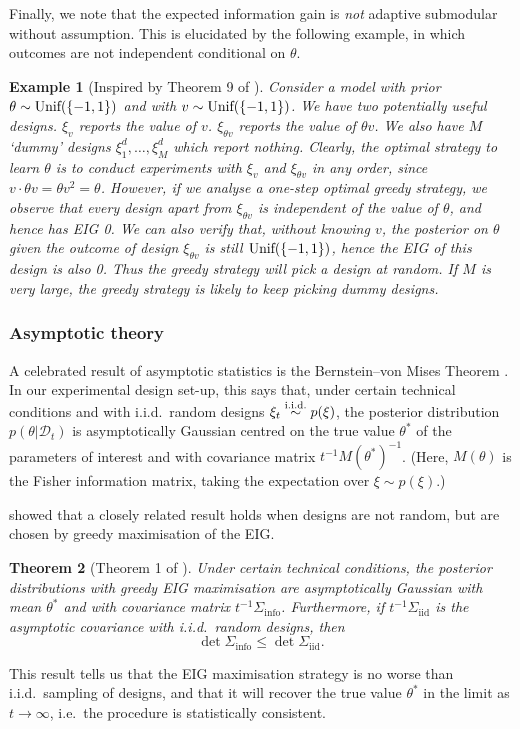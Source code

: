 \documentclass[a4paper, 10pt]{report}
\theoremstyle{plain}
\newtheorem{theorem}{Theorem}
\newtheorem{example}[theorem]{Example}
\begin{document}
	Finally, we note that the expected information gain is \emph{not} adaptive submodular without assumption. This is elucidated by the following example, in which outcomes are not independent conditional on $\theta$.
	\begin{example}[Inspired by Theorem 9 of \citet{golovin2010}]\label{example:golovin}
		Consider a model with prior $\theta \sim \textup{Unif}(\{-1, 1\})$ and with $v \sim \textup{Unif}(\{-1, 1\})$.
		We have two potentially useful designs. $\xi_v$ reports the value of $v$. $\xi_{\theta v}$ reports the value of $\theta v$.
		We also have $M$ `dummy' designs $\xi^d_1,\dots,\xi^d_M$ which report nothing.
		Clearly, the optimal strategy to learn $\theta$ is to conduct experiments with $\xi_v$ and $\xi_{\theta v}$ in any order, since $v \cdot \theta v = \theta v^2 = \theta$.
		However, if we analyse a one-step optimal greedy strategy, we observe that every design apart from $\xi_{\theta v}$ is independent of the value of $\theta$, and hence has EIG 0. We can also verify that, without knowing $v$, the posterior on $\theta$ given the outcome of design $\xi_{\theta v}$ is still $ \textup{Unif}(\{-1, 1\})$, hence the EIG of this design is also 0.
		Thus the greedy strategy will pick a design at random. If $M$ is very large, the greedy strategy is likely to keep picking dummy designs.
	\end{example}
	
	
	\subsubsection{Asymptotic theory}
	
	A celebrated result of asymptotic statistics is the Bernstein--von Mises Theorem \citep{van2000asymptotic}.
	In our experimental design set-up, this says that, under certain technical conditions and with i.i.d.~random designs $\xi_t \overset{\scriptstyle{\text{i.i.d.}}}{\sim} p(\xi)$, the posterior distribution $p(\theta|\mathcal{D}_t)$ is asymptotically Gaussian centred on the true value $\theta^*$ of the parameters of interest and with covariance matrix $t^{-1}M(\theta^*)^{-1}$. (Here, $M(\theta)$ is the Fisher information matrix, taking the expectation over $\xi\sim p(\xi)$.)
	
	\citet{paninski2005asymptotic} showed that a closely related result holds when designs are not random, but are chosen by greedy maximisation of the EIG.
	\begin{theorem}[Theorem 1 of \citet{paninski2005asymptotic}]
		Under certain technical conditions, the posterior distributions with greedy EIG maximisation are asymptotically Gaussian with mean $\theta^*$ and with covariance matrix $t^{-1}\Sigma_\text{info}$.
		Furthermore, if $t^{-1}\Sigma_\text{iid}$ is the asymptotic covariance with i.i.d.~random designs, then
		\begin{equation}
		\det \Sigma_\text{info} \le \det \Sigma_\text{iid}.
		\end{equation}
	\end{theorem}
	This result tells us that the EIG maximisation strategy is no worse than i.i.d.~sampling of designs, and that it will recover the true value $\theta^*$ in the limit as $t\to\infty$, i.e.~the procedure is statistically consistent.
	
\end{document}
